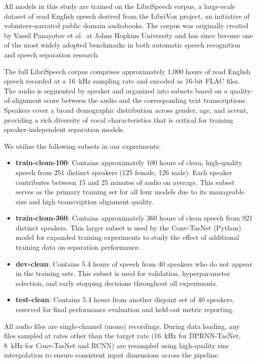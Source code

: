 \documentclass[conference]{IEEEtran}
\begin{document}
All models in this study are trained on the LibriSpeech corpus, a large-scale dataset of read English speech derived from the LibriVox project, an initiative of volunteer-narrated public domain audiobooks. The corpus was originally created by Vassil Panayotov et al.\ at Johns Hopkins University and has since become one of the most widely adopted benchmarks in both automatic speech recognition and speech separation research.

The full LibriSpeech corpus comprises approximately 1,000 hours of read English speech recorded at a 16~kHz sampling rate and encoded as 16-bit FLAC files. The audio is segmented by speaker and organized into subsets based on a quality-of-alignment score between the audio and the corresponding text transcriptions. Speakers cover a broad demographic distribution across gender, age, and accent, providing a rich diversity of vocal characteristics that is critical for training speaker-independent separation models.

We utilize the following subsets in our experiments:
\begin{itemize}[leftmargin=*,nosep]
    \item \textbf{train-clean-100}: Contains approximately 100 hours of clean, high-quality speech from 251 distinct speakers (125 female, 126 male). Each speaker contributes between 15 and 25 minutes of audio on average. This subset serves as the primary training set for all four models due to its manageable size and high transcription alignment quality.
    \item \textbf{train-clean-360}: Contains approximately 360 hours of clean speech from 921 distinct speakers. This larger subset is used by the Conv-TasNet (Python) model for expanded training experiments to study the effect of additional training data on separation performance.
    \item \textbf{dev-clean}: Contains 5.4 hours of speech from 40 speakers who do not appear in the training sets. This subset is used for validation, hyperparameter selection, and early stopping decisions throughout all experiments.
    \item \textbf{test-clean}: Contains 5.4 hours from another disjoint set of 40 speakers, reserved for final performance evaluation and held-out metric reporting.
\end{itemize}

All audio files are single-channel (mono) recordings. During data loading, any files sampled at rates other than the target rate (16~kHz for DPRNN-TasNet, 8~kHz for Conv-TasNet and RCNN) are resampled using high-quality sinc interpolation to ensure consistent input dimensions across the pipeline.
\end{document}
